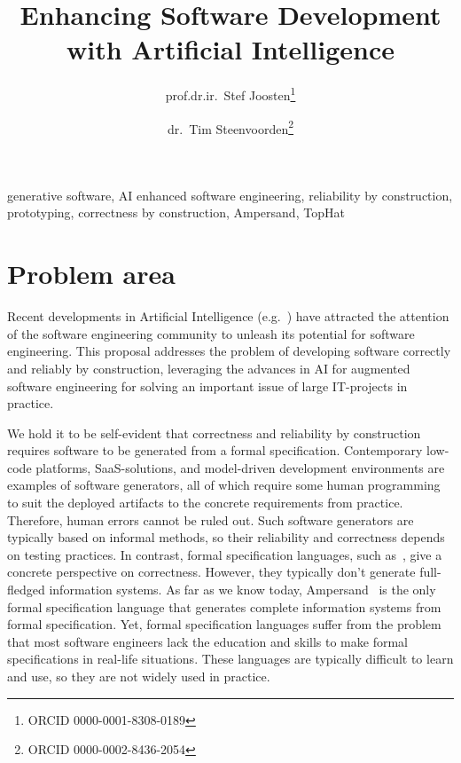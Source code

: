 \documentclass{elsarticle}
\begin{document}
% 

\title{Enhancing Software Development with Artificial Intelligence}
\author{prof.dr.ir.\ Stef Joosten\footnote{ORCID 0000-0001-8308-0189}}
\author{dr.\ Tim Steenvoorden\footnote{ORCID 0000-0002-8436-2054}}
\address{Open Universiteit Nederland, Heerlen, the Netherlands}

\begin{abstract}
\end{abstract}

\begin{keyword}
    generative software, AI enhanced software engineering, reliability by construction, prototyping, correctness by construction, Ampersand, TopHat
\end{keyword}
\maketitle

\section{Problem area}
    Recent developments in Artificial Intelligence (e.g.~\cite{Chen2021EvaluatingLL,Ernst2022AIDrivenDI,Imai2022}) have attracted
    the attention of the software engineering community to unleash its potential for software engineering.
    This proposal addresses the problem of developing software correctly and reliably by construction,
    leveraging the advances in AI for augmented software engineering for solving an important issue of large IT-projects in practice.

    We hold it to be self-evident that correctness and reliability by construction requires software to be generated from a formal specification.
    Contemporary low-code platforms, SaaS-solutions, and model-driven development environments are examples of software generators,
    all of which require some human programming to suit the deployed artifacts to the concrete requirements from practice.
    Therefore, human errors cannot be ruled out.
    Such software generators are typically based on informal methods, so their reliability and correctness depends on testing practices.
    In contrast, formal specification languages, such as~\cite{Alloy2006,CSP,Z}, give a concrete perspective on correctness.
    However, they typically don't generate full-fledged information systems.
    As far as we know today, Ampersand~\cite{JoostenRAMiCS2017} is the only formal specification language
    that generates complete information systems from formal specification.
    Yet, formal specification languages suffer from the problem that most software engineers lack the education and skills
    to make formal specifications in real-life situations.
    These languages are typically difficult to learn and use, so they are not widely used in practice.
\end{document}
